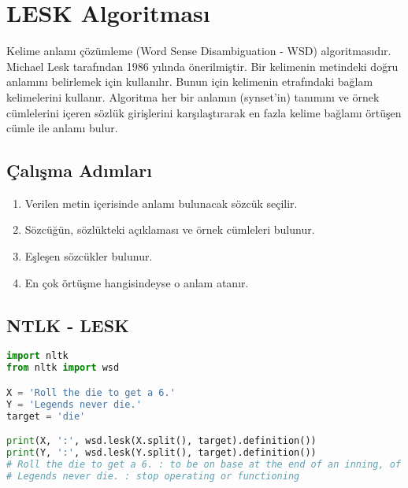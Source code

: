 \section{LESK Algoritması}
Kelime anlamı çözümleme (Word Sense Disambiguation - WSD) algoritmasıdır. Michael Lesk tarafından 1986 yılında önerilmiştir.  Bir kelimenin metindeki doğru anlamını belirlemek için kullanılır. Bunun için kelimenin etrafındaki bağlam kelimelerini kullanır. Algoritma her bir anlamın (synset'in) tanımını ve örnek cümlelerini içeren sözlük girişlerini karşılaştırarak en fazla kelime bağlamı örtüşen cümle ile anlamı bulur.

\subsection{Çalışma Adımları}
\begin{enumerate}
	\item Verilen metin içerisinde anlamı bulunacak sözcük seçilir.
	\item Sözcüğün, sözlükteki açıklaması ve örnek cümleleri bulunur.
	\item Eşleşen sözcükler bulunur.
	\item En çok örtüşme hangisindeyse o anlam atanır.
\end{enumerate}

\subsection{NTLK - LESK}
\begin{lstlisting}[language=Python]
import nltk
from nltk import wsd

X = 'Roll the die to get a 6.'
Y = 'Legends never die.'
target = 'die'

print(X, ':', wsd.lesk(X.split(), target).definition())
print(Y, ':', wsd.lesk(Y.split(), target).definition())
# Roll the die to get a 6. : to be on base at the end of an inning, of a player
# Legends never die. : stop operating or functioning
\end{lstlisting}

\newpage
